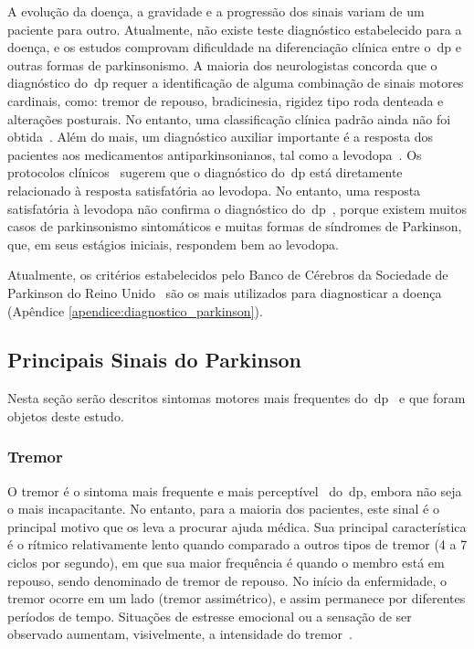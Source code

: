 A evolução da doença, a gravidade e a progressão dos sinais variam de um paciente para outro. Atualmente, não existe teste diagnóstico estabelecido para a doença, e os estudos comprovam dificuldade na diferenciação clínica entre o~\ac{dp} e outras formas de parkinsonismo. A maioria dos neurologistas concorda que o diagnóstico do~\ac{dp} requer a identificação de alguma combinação de sinais motores cardinais, como: tremor de repouso, bradicinesia, rigidez tipo roda denteada e alterações posturais. No entanto, uma classificação clínica padrão ainda não foi obtida~\cite{protpar010}. Além do mais, um diagnóstico auxiliar importante é a resposta dos pacientes aos medicamentos antiparkinsonianos, tal como a levodopa~\cite{protpar010}. Os protocolos clínicos~\cite{protpar010,national2006parkinson} sugerem que o diagnóstico do~\ac{dp} está diretamente relacionado à resposta satisfatória ao levodopa. No entanto, uma resposta satisfatória à levodopa não confirma o diagnóstico do~\ac{dp}~\cite{rowlandtratado}, porque 
existem muitos casos de parkinsonismo sintomáticos e muitas formas de síndromes de Parkinson, que, em seus estágios iniciais, respondem bem ao levodopa. 

Atualmente, os critérios estabelecidos pelo Banco de Cérebros da Sociedade de Parkinson do Reino Unido~\cite{national2006parkinson} são os mais utilizados para diagnosticar a doença (Apêndice \ref{apendice:diagnostico_parkinson}). 







\subsection{Principais Sinais do Parkinson}
Nesta seção serão descritos sintomas motores mais frequentes do~\ac{dp}~\cite{protpar010} e que foram objetos deste estudo.

\subsubsection{Tremor}\label{sec:tremor}
O tremor é o sintoma mais frequente e mais perceptível~\cite{jankovic2008} do~\ac{dp}, embora não seja o mais incapacitante. No entanto, para a maioria dos pacientes, este sinal é o principal motivo que os leva a procurar ajuda médica. Sua principal característica é o rítmico relativamente lento quando comparado a outros tipos de tremor (4 a 7 ciclos por segundo), em que sua maior frequência é quando o membro está em repouso, sendo denominado de tremor de repouso. No início da enfermidade, o tremor ocorre em um lado (tremor assimétrico), e assim permanece por diferentes períodos de tempo. Situações de estresse emocional ou a sensação de ser observado aumentam, visivelmente, a intensidade do tremor~\cite{jankovic2008}. 

